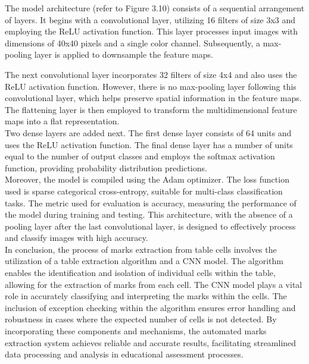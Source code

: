 \noindent The model architecture (refer to Figure 3.10) consists of a sequential arrangement of layers. It begins with a convolutional layer, utilizing 16 filters of size 3x3 and employing the ReLU activation function. This layer processes input images with dimensions of 40x40 pixels and a single color channel. Subsequently, a max-pooling layer is applied to downsample the feature maps.

\clearpage

\noindent The next convolutional layer incorporates 32 filters of size 4x4 and also uses the ReLU activation function. However, there is no max-pooling layer following this convolutional layer, which helps preserve spatial information in the feature maps. The flattening layer is then employed to transform the multidimensional feature maps into a flat representation.\\

\noindent Two dense layers are added next. The first dense layer consists of 64 units and uses the ReLU activation function. The final dense layer has a number of units equal to the number of output classes and employs the softmax activation function, providing probability distribution predictions.\\

\noindent Moreover, the model is compiled using the Adam optimizer. The loss function used is sparse categorical cross-entropy, suitable for multi-class classification tasks. The metric used for evaluation is accuracy, measuring the performance of the model during training and testing. This architecture, with the absence of a pooling layer after the last convolutional layer, is designed to effectively process and classify images with high accuracy.\\

\noindent In conclusion, the process of marks extraction from table cells involves the utilization of a table extraction algorithm and a CNN model. The algorithm enables the identification and isolation of individual cells within the table, allowing for the extraction of marks from each cell. The CNN model plays a vital role in accurately classifying and interpreting the marks within the cells. The inclusion of exception checking within the algorithm ensures error handling and robustness in cases where the expected number of cells is not detected. By incorporating these components and mechanisms, the automated marks extraction system achieves reliable and accurate results, facilitating streamlined data processing and analysis in educational assessment processes.

